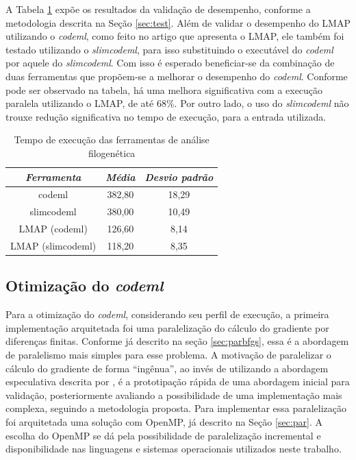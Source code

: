 \documentclass[cic,tc]{iiufrgs}
\begin{document}
A Tabela \ref{tbl:paml} expõe os resultados da validação de desempenho,
conforme a metodologia descrita na Seção \ref{sec:test}. Além de validar o
desempenho do LMAP utilizando o \textit{codeml}, como feito no artigo que
apresenta o LMAP, ele também foi testado utilizando o \textit{slimcodeml}, para
isso substituindo o executável do \textit{codeml} por aquele do
\textit{slimcodeml}. Com isso é esperado beneficiar-se da combinação de duas
ferramentas que propõem-se a melhorar o desempenho do \textit{codeml}.
Conforme pode ser observado na tabela, há uma melhora significativa com a
execução paralela utilizando o LMAP, de até 68\%. Por outro lado, o uso do
\textit{slimcodeml} não trouxe redução significativa no tempo de execução, para
a entrada utilizada.

\begin{table}[h]
    \caption{Tempo de execução das ferramentas de análise filogenética}
    \centering
        \begin{tabular}{c|c|c}
          \hline
          \textit{Ferramenta} & \textit{Média} & \textit{Desvio padrão} \\
          \hline
          \hline
          codeml            & 382,80 & 18,29 \\
          slimcodeml        & 380,00 & 10,49 \\
          LMAP (codeml)     & 126,60 & 8,14 \\
          LMAP (slimcodeml) & 118,20 & 8,35  \\
          \hline
        \end{tabular}
    \label{tbl:paml}
\end{table}

\subsection{Otimização do \textit{codeml}}
\label{sec:optcodeml}

Para a otimização do \textit{codeml}, considerando seu perfil de execução, a
primeira implementação arquitetada foi uma paralelização do cálculo do
gradiente por diferenças finitas. Conforme já descrito na seção
\ref{sec:parbfgs}, essa é a abordagem de paralelismo mais simples para esse
problema. A motivação de paralelizar o cálculo do gradiente de forma
``ingênua'', ao invés de utilizando a abordagem especulativa descrita por
\cite{byrd1988parallel}, é a prototipação rápida de uma abordagem inicial para
validação, posteriormente avaliando a possibilidade de uma implementação mais
complexa, seguindo a metodologia proposta. Para implementar essa paralelização
foi arquitetada uma solução com OpenMP, já descrito na Seção \ref{sec:par}. A
escolha do OpenMP se dá pela possibilidade de paralelização incremental e
disponibilidade nas linguagens e sistemas operacionais utilizados neste
trabalho.
\end{document}
